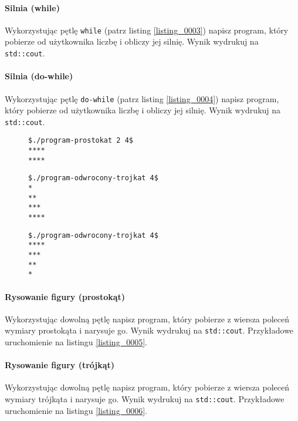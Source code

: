\documentclass[11pt,a4paper,titlepage,onecolumn]{article}
\begin{document}
\paragraph{Silnia (while)} Wykorzystując pętlę \texttt{while} (patrz listing
\ref{listing_0003}) napisz program, który pobierze od użytkownika liczbę i
obliczy jej silnię. Wynik wydrukuj na \texttt{std::cout}.

\paragraph{Silnia (do-while)} Wykorzystując pętlę \texttt{do-while} (patrz listing
\ref{listing_0004}) napisz program, który pobierze od użytkownika liczbę i
obliczy jej silnię. Wynik wydrukuj na \texttt{std::cout}.

\begin{figure}[!htp]
\begin{lstlisting}[caption={prostokąt z gwiazdek},
    captionpos=b,
    label=listing_0005]
$./program-prostokat 2 4$
****
****
\end{lstlisting}
\end{figure}

\begin{figure}[!htp]
\begin{lstlisting}[caption={trójkąt gwiazdek},
    captionpos=b,
    label=listing_0006]
$./program-odwrocony-trojkat 4$
*
**
***
****
\end{lstlisting}
\end{figure}

\begin{figure}[!htp]
\begin{lstlisting}[caption={odwrócony trójkąt gwiazdek},
    captionpos=b,
    label=listing_0007]
$./program-odwrocony-trojkat 4$
****
***
**
*
\end{lstlisting}
\end{figure}

\paragraph{Rysowanie figury (prostokąt)}
\label{ex_1_draw_a_rectangle_on_stdout}
Wykorzystując dowolną pętlę napisz
program, który pobierze z wiersza poleceń wymiary prostokąta i narysuje go.
Wynik wydrukuj na \texttt{std::cout}. Przykładowe uruchomienie na listingu
\ref{listing_0005}.

\paragraph{Rysowanie figury (trójkąt)} Wykorzystując dowolną pętlę napisz
program, który pobierze z wiersza poleceń wymiary trójkąta i narysuje go. Wynik
wydrukuj na \texttt{std::cout}. Przykładowe uruchomienie na listingu
\ref{listing_0006}.
\end{document}
